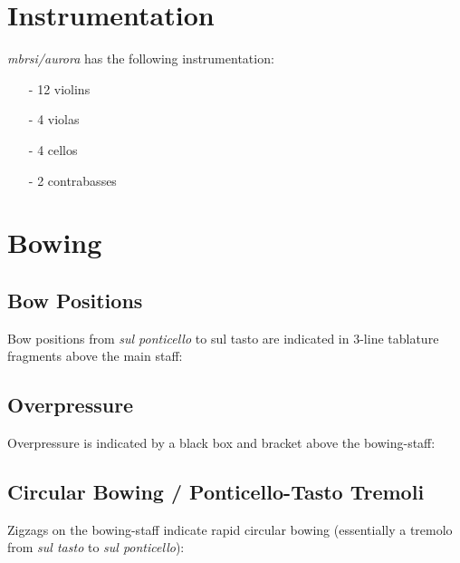 \begin{multicols}{2}

\section{Instrumentation}
\emph{mbrsi/aurora} has the following instrumentation:\\
\begin{itemize}
	\item[-] 12 violins
	\item[-] 4 violas
	\item[-] 4 cellos
	\item[-] 2 contrabasses
\end{itemize}

\section{Bowing}

\subsection{Bow Positions}

Bow positions from \emph{sul ponticello} to {sul tasto} are indicated in 3-line tablature fragments above the main staff:\\

\begin{figurehere}
\end{figurehere}

\subsection{Overpressure}

Overpressure is indicated by a black box and bracket above the bowing-staff:\\

\begin{figurehere}
\end{figurehere}

\subsection{Circular Bowing / Ponticello-Tasto Tremoli}

Zigzags on the bowing-staff indicate rapid circular bowing (essentially a tremolo from \emph{sul tasto} to \emph{sul ponticello}):\\


\end{multicols}
